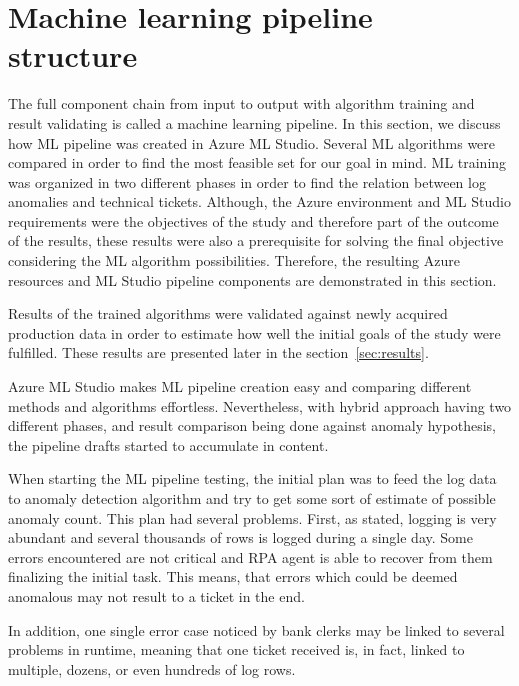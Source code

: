

\section{Machine learning pipeline structure}\label{sec:ml-pipeline}

The full component chain from input to output
with algorithm training and result validating
is called a machine learning pipeline.
In this section,
we discuss how ML pipeline was created in Azure ML Studio.
Several ML algorithms were compared
in order to find the most feasible set for our goal in mind.
ML training was organized in two different phases
in order to find the relation between
log anomalies and technical tickets.
Although, the Azure environment and ML Studio requirements
were the objectives of the study and therefore part of the outcome of the results,
these results were also a prerequisite for solving the final objective
considering the ML algorithm possibilities.
Therefore,
the resulting Azure resources and ML Studio pipeline components
are demonstrated in this section.

Results of the trained algorithms
were validated against newly acquired production data
in order to estimate how well the initial goals of the study
were fulfilled.
These results are presented later in the section~\ref{sec:results}.

Azure ML Studio makes ML pipeline creation easy
and comparing different methods and algorithms effortless.
Nevertheless,
with hybrid approach having two different phases,
and result comparison being done against anomaly hypothesis,
the pipeline drafts started to accumulate in content.

When starting the ML pipeline testing,
the initial plan was to feed the log data to anomaly detection algorithm
and try to get some sort of estimate of possible anomaly count.
This plan had several problems.
First, as stated, logging is very abundant
and several thousands of rows is logged
during a single day.
Some errors encountered are not critical
and RPA agent is able to recover from them
finalizing the initial task.
This means,
that errors which could be deemed anomalous
may not result to a ticket in the end.

In addition,
one single error case noticed by bank clerks
may be linked to several problems in runtime,
meaning that one ticket received is,
in fact, linked to multiple, dozens, or
even hundreds of log rows.

